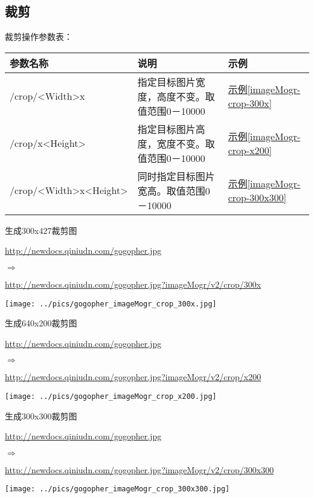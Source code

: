 \documentclass[11pt, oneside]{book}
\newcommand{\qsym}[1]{
\footnotesize
\noindent
#1\par
\normalsize
}
\newcommand{\qpara}[1]{
\vspace{0.3em}
\noindent
#1\par
\vspace{0.3em}
}
\newcommand{\qsamplelink}[1]{
\vspace{0.2em}
\noindent
#1\par
\vspace{0.1em}
}
\newcommand{\qurl}[1]{\footnotesize\url{#1}\normalsize}
\newcommand{\qtable}[1]{\footnotesize\vspace{0.5em}#1\vspace{0.5em}\normalsize}
\newcommand{\qsample}[1]{\hyperref[#1]{示例\ref*{#1}}}
\begin{document}
\subsection{裁剪}

\qpara{裁剪操作参数表：}
\qtable{
\label{crop-spec}
\begin{tabular}[t]{|l|p{20em}|p{5em}|}
\hline
参数名称 & 说明 & 示例 \\
\hline
/crop/\textless Width\textgreater x & 指定目标图片宽度，高度不变。取值范围0－10000 & \qsample{imageMogr-crop-300x} \\
\hline
/crop/x\textless Height\textgreater & 指定目标图片高度，宽度不变。取值范围0－10000 & \qsample{imageMogr-crop-x200} \\
\hline
/crop/\textless Width\textgreater x\textless Height\textgreater & 同时指定目标图片宽高。取值范围0－10000 & \qsample{imageMogr-crop-300x300} \\
\hline
\end{tabular}
}

\begin{sample}
  \caption{生成300x427裁剪图}
    \qsamplelink{\qurl{http://newdocs.qiniudn.com/gogopher.jpg}}
    \qsym{$\Rightarrow$}
    \qsamplelink{\qurl{http://newdocs.qiniudn.com/gogopher.jpg?imageMogr/v2/crop/300x}}

    \begin{center}
      \texttt{[image: ../pics/gogopher\_imageMogr\_crop\_300x.jpg]}
    \end{center}
  \label{imageMogr-crop-300x}
\end{sample}

\begin{sample}
  \caption{生成640x200裁剪图}
    \qsamplelink{\qurl{http://newdocs.qiniudn.com/gogopher.jpg}}
    \qsym{$\Rightarrow$}
    \qsamplelink{\qurl{http://newdocs.qiniudn.com/gogopher.jpg?imageMogr/v2/crop/x200}}

    \begin{center}
      \texttt{[image: ../pics/gogopher\_imageMogr\_crop\_x200.jpg]}
    \end{center}
  \label{imageMogr-crop-x200}
\end{sample}

\begin{sample}
  \caption{生成300x300裁剪图}
    \qsamplelink{\qurl{http://newdocs.qiniudn.com/gogopher.jpg}}
    \qsym{$\Rightarrow$}
    \qsamplelink{\qurl{http://newdocs.qiniudn.com/gogopher.jpg?imageMogr/v2/crop/300x300}}

    \begin{center}
      \texttt{[image: ../pics/gogopher\_imageMogr\_crop\_300x300.jpg]}
    \end{center}
  \label{imageMogr-crop-300x300}
\end{sample}
\end{document}
